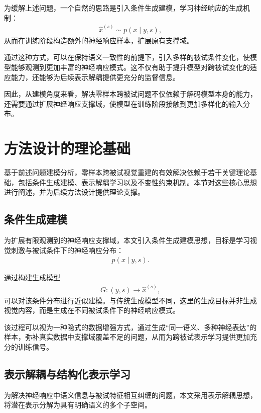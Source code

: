 为缓解上述问题，一个自然的思路是引入条件生成建模，学习神经响应的生成机制：
\begin{align}
  \hat{x}^{(s)} \sim p(x \mid y,s),
\end{align}
从而在训练阶段构造额外的神经响应样本，扩展原有支撑域。

通过这种方式，可以在保持语义一致性的前提下，引入多样的被试条件变化，使模型能够观测到更加丰富的神经响应模式。这不仅有助于提升模型对跨被试变化的适应能力，还能够为后续表示解耦提供更充分的监督信息。

因此，从建模角度来看，解决零样本跨被试问题不仅依赖于解码模型本身的能力，还需要通过扩展神经响应支撑域，使模型在训练阶段接触到更加多样化的输入分布。

\section{方法设计的理论基础}

基于前述问题建模分析，零样本跨被试视觉重建的有效解决依赖于若干关键理论基础，包括条件生成建模、表示解耦学习以及不变性约束机制。本节对这些核心思想进行阐述，并为后续方法设计提供理论支撑。

\subsection{条件生成建模}

为扩展有限观测到的神经响应支撑域，本文引入条件生成建模思想，目标是学习视觉刺激与被试条件下的神经响应分布：
\begin{align}
  p(x \mid y,s).
\end{align}

通过构建生成模型
\begin{align}
  G:(y,s) \rightarrow \hat{x}^{(s)},
\end{align}
可以对该条件分布进行近似建模。与传统生成模型不同，这里的生成目标并非生成视觉内容，而是生成在不同被试条件下的神经响应模式。

该过程可以视为一种隐式的数据增强方式，通过生成“同一语义、多种神经表达”的样本，弥补真实数据中支撑域覆盖不足的问题，从而为跨被试表示学习提供更加充分的训练信号。

\subsection{表示解耦与结构化表示学习}

为解决神经响应中语义信息与被试特征相互纠缠的问题，本文采用表示解耦思想，将潜在表示分解为具有明确语义的多个子空间。

